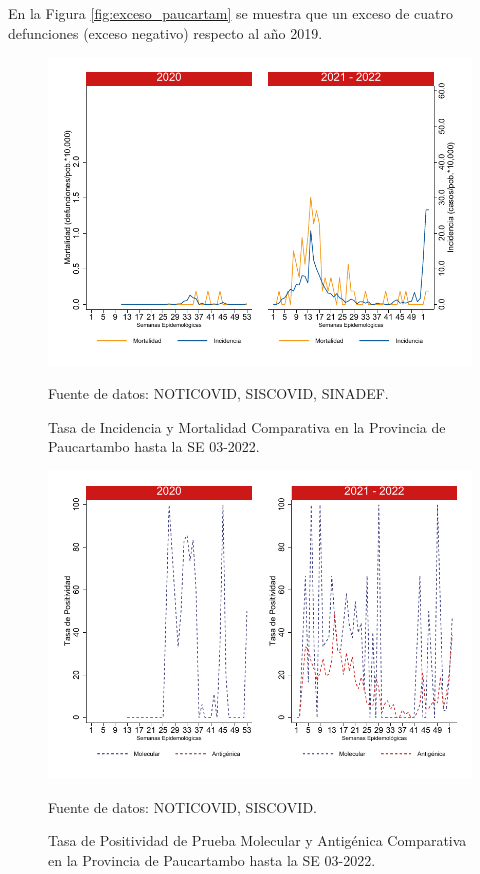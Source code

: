 \documentclass[12pt,a4paper,openany]{book}
\begin{document}
	En la Figura \ref{fig:exceso_paucartam} se muestra que un exceso de cuatro defunciones (exceso negativo) respecto al año 2019.
		
		\begin{figure}[h]
			\caption{Tasa de Incidencia y Mortalidad Comparativa en la Provincia de Paucartambo hasta la SE 03-2022.}\label{fig:inc_mort_paucartam}
			\begin{center}
				\includegraphics[width=0.7\linewidth]{../figuras/incidencia_mortalidad_20_21_11}
			\end{center}
			{\footnotesize {Fuente de datos: NOTICOVID, SISCOVID, SINADEF.}}
		\end{figure}
		
		\begin{figure}[h]
			\caption{Tasa de Positividad de Prueba Molecular y Antigénica Comparativa en la Provincia de Paucartambo hasta la SE 03-2022.}\label{fig:positividad_paucartam}
			\begin{center}
				\includegraphics[width=0.7\linewidth]{../figuras/positividad_20_21_11}
			\end{center}
			{\footnotesize {Fuente de datos: NOTICOVID, SISCOVID.}}
		\end{figure}
		
\end{document}
